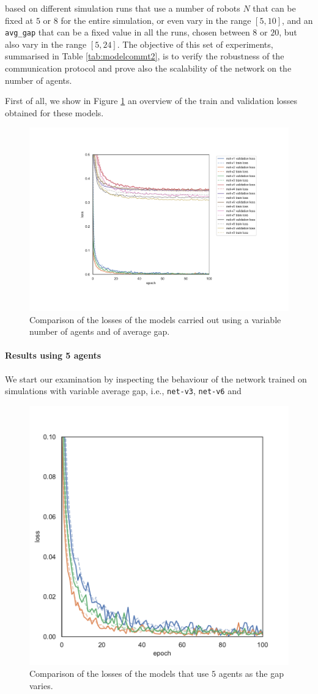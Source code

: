 \noindent
based on different simulation runs that use a number of robots $N$ that 
can be fixed at $5$ or $8$ for the entire simulation, or even vary in the range $[5, 
10]$, and an \texttt{avg\_gap} that can be a fixed value in all the runs, chosen 
between $8$ or $20$, but also vary in the range $[5, 24]$. 
The objective of this set of experiments, summarised in Table 
\ref{tab:modelcommt2}, is to verify the robustness of the communication 
protocol and prove also the scalability of the network on the number of agents.

First of all, we show in Figure \ref{fig:t2lossallt} an overview of the train and 
validation losses obtained for these models.
\begin{figure}[!htb]
	\centering
	\includegraphics[width=.8\textwidth]{contents/images/task2/loss-communication-all@}%
	\caption[Comparison of losses of the second set of experiments.]{Comparison 
		of the losses of the models carried out using a variable number of agents and 
		of average gap.}
	\label{fig:t2lossallt}
\end{figure}

\paragraph*{Results using 5 agents}

We start our examination by inspecting the behaviour of the network trained on 
simulations with variable average gap, i.e., \texttt{net-v3}, \texttt{net-v6} and 
\begin{figure}[!htb]
	\centering
	\includegraphics[width=.45\textwidth]{contents/images/task2/loss-communication-N5}
	\caption[Comparison of the losses of the models that use $5$ 
	agents.]{Comparison of the losses of the models that use $5$ agents as 
		the gap varies.}
	\label{fig:commlossn5t2}
\end{figure}

